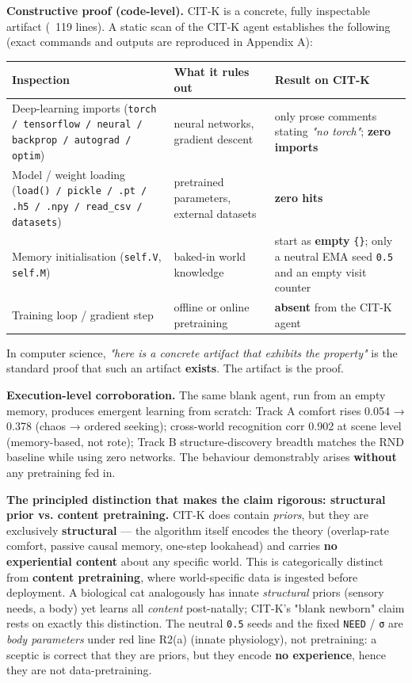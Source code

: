 \documentclass[11pt]{article}
\begin{document}
\textbf{Constructive proof (code-level).} CIT-K is a concrete, fully inspectable artifact (~119 lines). A static scan of the CIT-K agent establishes the following (exact commands and outputs are reproduced in Appendix A):

\begin{table}[ht]\centering
\begin{tabular}{lll}
\toprule
Inspection & What it rules out & Result on CIT-K \\
\midrule
Deep-learning imports (\texttt{torch / tensorflow / neural / backprop / autograd / optim}) & neural networks, gradient descent & only prose comments stating \emph{"no torch"}; \textbf{zero imports} \\
Model / weight loading (\texttt{load() / pickle / .pt / .h5 / .npy / read\_csv / datasets}) & pretrained parameters, external datasets & \textbf{zero hits} \\
Memory initialisation (\texttt{self.V}, \texttt{self.M}) & baked-in world knowledge & start as \textbf{empty} \texttt{\{\}}; only a neutral EMA seed \texttt{0.5} and an empty visit counter \\
Training loop / gradient step & offline or online pretraining & \textbf{absent} from the CIT-K agent \\
\bottomrule
\end{tabular}
\end{table}

In computer science, \emph{"here is a concrete artifact that exhibits the property"} is the standard proof that such an artifact \textbf{exists}. The artifact is the proof.

\textbf{Execution-level corroboration.} The same blank agent, run from an empty memory, produces emergent learning from scratch: Track A comfort rises 0.054 → 0.378 (chaos → ordered seeking); cross-world recognition corr 0.902 at scene level (memory-based, not rote); Track B structure-discovery breadth matches the RND baseline while using zero networks. The behaviour demonstrably arises \textbf{without} any pretraining fed in.

\textbf{The principled distinction that makes the claim rigorous: structural prior vs. content pretraining.} CIT-K does contain \emph{priors}, but they are exclusively \textbf{structural} — the algorithm itself encodes the theory (overlap-rate comfort, passive causal memory, one-step lookahead) and carries \textbf{no experiential content} about any specific world. This is categorically distinct from \textbf{content pretraining}, where world-specific data is ingested before deployment. A biological cat analogously has innate \emph{structural} priors (sensory needs, a body) yet learns all \emph{content} post-natally; CIT-K's "blank newborn" claim rests on exactly this distinction. The neutral \texttt{0.5} seeds and the fixed \texttt{NEED} / \texttt{σ} are \emph{body parameters} under red line R2(a) (innate physiology), not pretraining: a sceptic is correct that they are priors, but they encode \textbf{no experience}, hence they are not data-pretraining.
\end{document}
